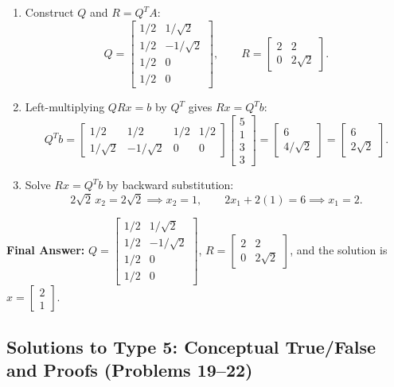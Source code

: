 \documentclass[11pt, letterpaper]{article}
\theoremstyle{definition}
\theoremstyle{remark}
\begin{document}
\begin{enumerate}[label=\textbf{Step \arabic*:}]
\[    \]
    \item Construct $Q$ and $R = Q^T A$:
    \[
        Q = \begin{bmatrix} 1/2 & 1/\sqrt{2} \\ 1/2 & -1/\sqrt{2} \\ 1/2 & 0 \\ 1/2 & 0 \end{bmatrix}, \qquad
        R = \begin{bmatrix} 2 & 2 \\ 0 & 2\sqrt{2} \end{bmatrix}.
    \]
    \item Left-multiplying $QRx = b$ by $Q^T$ gives $Rx = Q^T b$:
    \[
        Q^T b = \begin{bmatrix} 1/2 & 1/2 & 1/2 & 1/2 \\ 1/\sqrt{2} & -1/\sqrt{2} & 0 & 0 \end{bmatrix} \begin{bmatrix} 5 \\ 1 \\ 3 \\ 3 \end{bmatrix} = \begin{bmatrix} 6 \\ 4/\sqrt{2} \end{bmatrix} = \begin{bmatrix} 6 \\ 2\sqrt{2} \end{bmatrix}.
    \]
    \item Solve $Rx = Q^T b$ by backward substitution:
    \[
        2\sqrt{2}\,x_2 = 2\sqrt{2} \implies x_2 = 1, \qquad 2x_1 + 2(1) = 6 \implies x_1 = 2.
    \]
\end{enumerate}
\textbf{Final Answer:} $Q = \begin{bmatrix} 1/2 & 1/\sqrt{2} \\ 1/2 & -1/\sqrt{2} \\ 1/2 & 0 \\ 1/2 & 0 \end{bmatrix}$, $R = \begin{bmatrix} 2 & 2 \\ 0 & 2\sqrt{2} \end{bmatrix}$, and the solution is $x = \begin{bmatrix} 2 \\ 1 \end{bmatrix}$.

\subsection{Solutions to Type 5: Conceptual True/False and Proofs (Problems 19--22)}
\end{document}
